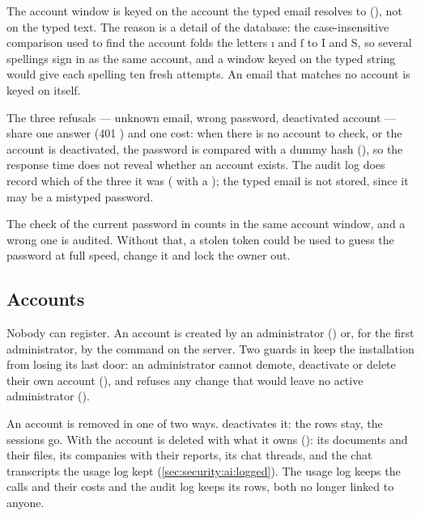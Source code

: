 The account window is keyed on the account the typed email resolves to
(), not on the typed text. The reason is a detail of the
database: the case-insensitive comparison used to find the account folds the letters ı and ſ
to I and S, so several spellings sign in as the same account, and a window keyed on the
typed string would give each spelling ten fresh attempts. An email that matches no account is
keyed on itself.

The three refusals --- unknown email, wrong password, deactivated account --- share one
answer (401 ) and one cost: when there is no account to check, or
the account is deactivated, the password is compared with a dummy hash (), so the response time
does not reveal whether an account exists. The audit log does record which of the three it
was ( with a ); the typed email is not stored, since it
may be a mistyped password.

The check of the current password in  counts in the
same account window, and a wrong one is audited. Without that, a stolen token could be used
to guess the password at full speed, change it and lock the owner out.

\subsection{Accounts}

Nobody can register. An account is created by an administrator
() or, for the first administrator, by the command
 on the server. Two guards in  keep the
installation from losing its last door: an administrator cannot demote, deactivate or delete
their own account (), and  refuses any
change that would leave no active administrator ().

An account is removed in one of two ways.  deactivates it: the
rows stay, the sessions go. With  the account is deleted with what it owns
(): its documents and their files, its companies with their reports, its
chat threads, and the chat transcripts the usage log kept (\cref{sec:security:ai:logged}).
The usage log keeps the calls and their costs and the audit log keeps its rows, both no
longer linked to anyone.


